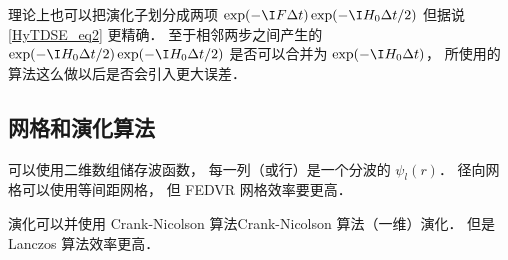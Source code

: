 理论上也可以把演化子划分成两项 $\exp(-\I F \Delta t)\exp(-\I H_0 {\Delta t}/{2})$ 但据说\autoref{HyTDSE_eq2} 更精确． 至于相邻两步之间产生的 $\exp(-\I H_0 {\Delta t}/{2})\exp(-\I H_0 {\Delta t}/{2})$ 是否可以合并为 $\exp(-\I H_0 {\Delta t})$， 所使用的算法这么做以后是否会引入更大误差．

\subsection{网格和演化算法}

可以使用二维数组储存波函数， 每一列（或行）是一个分波的 $\psi_l(r)$． 径向网格可以使用等间距网格， 但 FEDVR 网格效率要更高．

演化可以并使用 Crank-Nicolson 算法Crank-Nicolson 算法（一维）演化． 但是 Lanczos 算法效率更高．
